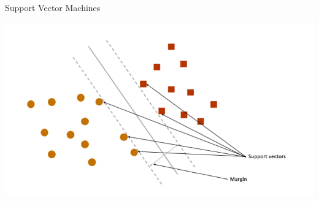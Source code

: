 \documentclass[handout]{beamer}
\begin{document}
\begin{frame}{Support Vector Machines}
	
	\begin{center}
		\includegraphics[width=\linewidth,height=\textheight,keepaspectratio]{../pictures/SVM.png} \\\
	\end{center}
	
\end{frame}
\end{document}
